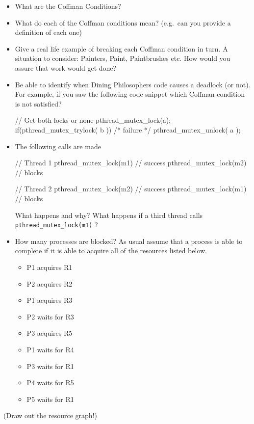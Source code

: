 \begin{itemize}
\item
  What are the Coffman Conditions?
\item
  What do each of the Coffman conditions mean? (e.g.~can you provide a definition of each one)
\item
  Give a real life example of breaking each Coffman condition in turn. A situation to consider: Painters, Paint, Paintbrushes etc. How would you assure that work would get done?
\item
  Be able to identify when Dining Philosophers code causes a deadlock (or not). For example, if you saw the following code snippet which Coffman condition is not satisfied?

\begin{code}[language=C]
// Get both locks or none
pthread_mutex_lock(a);
if(pthread_mutex_trylock( b )) { /* failure */
  pthread_mutex_unlock( a );
}
\end{code}
\item
  The following calls are made

\begin{code}[language=c]
// Thread 1
pthread_mutex_lock(m1) // success
pthread_mutex_lock(m2) // blocks

// Thread 2
pthread_mutex_lock(m2) // success
pthread_mutex_lock(m1) // blocks
\end{code}

  What happens and why? What happens if a third thread calls
  \texttt{pthread\_mutex\_lock(m1)} ?
\item
  How many processes are blocked? As usual assume that a process is able
  to complete if it is able to acquire all of the resources listed
  below.

  \begin{itemize}
  \tightlist
  \item
    P1 acquires R1
  \item
    P2 acquires R2
  \item
    P1 acquires R3
  \item
    P2 waits for R3
  \item
    P3 acquires R5
  \item
    P1 waits for R4
  \item
    P3 waits for R1
  \item
    P4 waits for R5
  \item
    P5 waits for R1
  \end{itemize}
\end{itemize}

(Draw out the resource graph!)


